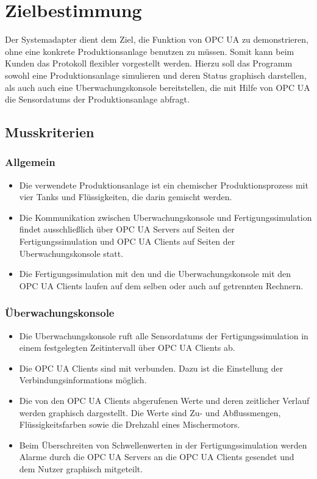\documentclass[parskip=full]{scrartcl}
\begin{document}
\pagebreak
\section{Zielbestimmung}
Der \gls{Systemadapter} dient dem Ziel, die Funktion von \gls{OPC UA} zu demonstrieren, ohne eine konkrete \gls{Produktionsanlage}
benutzen zu müssen. Somit kann beim Kunden das Protokoll flexibler vorgestellt werden. Hierzu soll das Programm
sowohl eine \gls{Produktionsanlage} simulieren und deren Status graphisch darstellen, als auch auch eine \gls{Uberwachungskonsole}
bereitstellen, die mit Hilfe von \gls{OPC UA} die \glspl{Sensordatum} der \gls{Produktionsanlage} abfragt.\\

\subsection{Musskriterien}
\subsubsection{Allgemein}
\begin{itemize}
  \item Die verwendete \gls{Produktionsanlage} ist ein chemischer Produktionsprozess mit vier Tanks und Flüssigkeiten, die darin gemischt werden.
  \item Die Kommunikation zwischen \gls{Uberwachungskonsole} und \gls{Fertigungssimulation} findet ausschließlich \"uber
  \glspl{OPC UA Server} auf Seiten der \gls{Fertigungssimulation} und \glspl{OPC UA Client} auf Seiten der \gls{Uberwachungskonsole} statt.
  \item Die \gls{Fertigungssimulation} mit den  und die \gls{Uberwachungskonsole} mit den \glspl{OPC UA Client} laufen auf dem selben oder auch auf getrennten Rechnern.
\end{itemize}

\subsubsection{Überwachungskonsole}
\begin{itemize}
  \item Die \gls{Uberwachungskonsole} ruft alle \glspl{Sensordatum} der \gls{Fertigungssimulation} in einem festgelegten Zeitintervall
  über \glspl{OPC UA Client} ab.
  \item Die \glspl{OPC UA Client} sind mit  verbunden. Dazu ist die Einstellung der \glspl{Verbindungsinformation} möglich.
  \item Die von den \glspl{OPC UA Client} abgerufenen Werte und deren zeitlicher Verlauf werden graphisch dargestellt. Die Werte sind Zu- und Abflussmengen,
    Flüssigkeitsfarben sowie die Drehzahl eines Mischermotors.
  \item Beim Überschreiten von Schwellenwerten in der \gls{Fertigungssimulation} werden Alarme durch die \glspl{OPC UA Server} an
  die \glspl{OPC UA Client} gesendet und dem Nutzer graphisch mitgeteilt.
\end{itemize}
\end{document}
